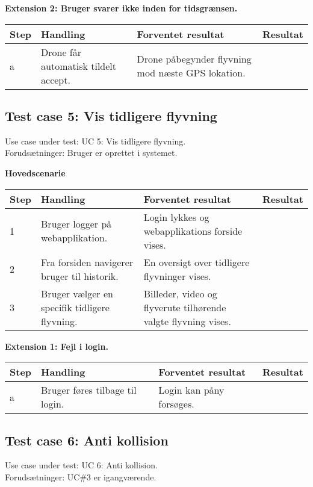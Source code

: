 \textbf{Extension 2: Bruger svarer ikke inden for tidsgrænsen.}
\begin{table}[H]
	\centering
		\begin{tabular}{|l|p{5 cm}|p{5 cm}|p{3.5 cm}|} 
		\hline
			Step & Handling & Forventet resultat & Resultat\\ \hline
			a & Drone får automatisk tildelt accept. & Drone påbegynder flyvning mod næste GPS lokation. & \\ \hline
		\end{tabular}
\end{table}

\newpage
\subsection*{Test case 5: Vis tidligere flyvning}
Use case under test: UC 5: Vis tidligere flyvning.\\
Forudsætninger:	Bruger er oprettet i systemet.

\textbf{Hovedscenarie}
\begin{table}[H]
	\centering
		\begin{tabular}{|l|p{5 cm}|p{5 cm}|p{3.5 cm}|} 
		\hline
			Step & Handling & Forventet resultat & Resultat\\ \hline
			1 & Bruger logger på webapplikation. & Login lykkes og webapplikations forside vises. &  \\ \hline
			2 & Fra forsiden navigerer bruger til historik. & En oversigt over tidligere flyvninger vises. & \\ \hline
			3 & Bruger vælger en specifik tidligere flyvning. &  Billeder, video og flyverute tilhørende valgte flyvning vises. & \\ \hline			
		\end{tabular}
\end{table}

\textbf{Extension 1: Fejl i login.}
\begin{table}[H]
	\centering
		\begin{tabular}{|l|p{5 cm}|p{5 cm}|p{3.5 cm}|} 
		\hline
			Step & Handling & Forventet resultat & Resultat\\ \hline
			a & Bruger føres tilbage til login. & Login kan påny forsøges. & \\ \hline
		\end{tabular}
\end{table}

\subsection*{Test case 6: Anti kollision}
Use case under test: UC 6: Anti kollision.\\
Forudsætninger:	UC\#3 er igangværende.

